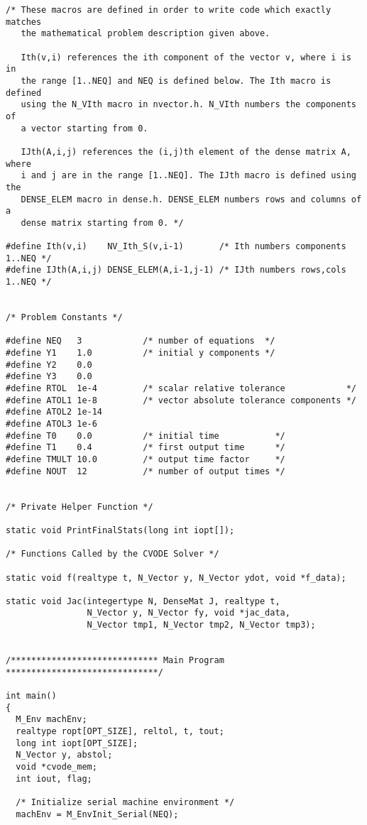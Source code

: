 \begin{verbatim}
/* These macros are defined in order to write code which exactly matches
   the mathematical problem description given above.

   Ith(v,i) references the ith component of the vector v, where i is in
   the range [1..NEQ] and NEQ is defined below. The Ith macro is defined
   using the N_VIth macro in nvector.h. N_VIth numbers the components of
   a vector starting from 0.

   IJth(A,i,j) references the (i,j)th element of the dense matrix A, where
   i and j are in the range [1..NEQ]. The IJth macro is defined using the
   DENSE_ELEM macro in dense.h. DENSE_ELEM numbers rows and columns of a
   dense matrix starting from 0. */

#define Ith(v,i)    NV_Ith_S(v,i-1)       /* Ith numbers components 1..NEQ */
#define IJth(A,i,j) DENSE_ELEM(A,i-1,j-1) /* IJth numbers rows,cols 1..NEQ */


/* Problem Constants */

#define NEQ   3            /* number of equations  */
#define Y1    1.0          /* initial y components */
#define Y2    0.0
#define Y3    0.0
#define RTOL  1e-4         /* scalar relative tolerance            */
#define ATOL1 1e-8         /* vector absolute tolerance components */
#define ATOL2 1e-14
#define ATOL3 1e-6
#define T0    0.0          /* initial time           */
#define T1    0.4          /* first output time      */
#define TMULT 10.0         /* output time factor     */
#define NOUT  12           /* number of output times */


/* Private Helper Function */

static void PrintFinalStats(long int iopt[]);

/* Functions Called by the CVODE Solver */

static void f(realtype t, N_Vector y, N_Vector ydot, void *f_data);

static void Jac(integertype N, DenseMat J, realtype t,
                N_Vector y, N_Vector fy, void *jac_data,
                N_Vector tmp1, N_Vector tmp2, N_Vector tmp3);


/***************************** Main Program ******************************/

int main()
{
  M_Env machEnv;
  realtype ropt[OPT_SIZE], reltol, t, tout;
  long int iopt[OPT_SIZE];
  N_Vector y, abstol;
  void *cvode_mem;
  int iout, flag;

  /* Initialize serial machine environment */
  machEnv = M_EnvInit_Serial(NEQ);


\end{verbatim}
